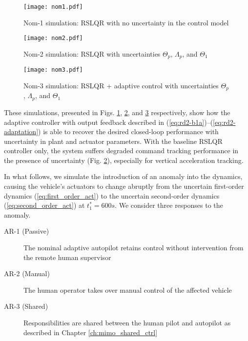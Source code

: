 \begin{figure}[htbp]
	\centering
	\texttt{[image: nom1.pdf]}
	\caption{Nom-1 simulation: RSLQR with no uncertainty in the control model}
	\label{fig:nom1}
\end{figure}

\begin{figure}[htbp]
	\centering
	\texttt{[image: nom2.pdf]}
	\caption{Nom-2 simulation: RSLQR with uncertainties $\Theta_p$, $\Lambda_p$, and $\Theta_1$}
	\label{fig:nom2}
\end{figure}

\begin{figure}[htbp]
	\centering
	\texttt{[image: nom3.pdf]}
	\caption{Nom-3 simulation: RSLQR + adaptive control with uncertainties $\Theta_p$, $\Lambda_p$, and $\Theta_1$}
	\label{fig:nom3}
\end{figure}

These simulations, presented in Figs. \ref{fig:nom1}, \ref{fig:nom2}, and \ref{fig:nom3} respectively, show how the adaptive controller with output feedback described in (\ref{eq:rd2-b1a})--(\ref{eq:rd2-adaptation}) is able to recover the desired closed-loop performance with uncertainty in plant and actuator parameters. With the baseline RSLQR controller only, the system suffers degraded command tracking performance in the presence of uncertainty (Fig. \ref{fig:nom2}), especially for vertical acceleration tracking.

In what follows, we simulate the introduction of an anomaly into the dynamics, causing the vehicle's actuators to change abruptly from the uncertain first-order dynamics (\ref{eq:first_order_act}) to the uncertain second-order dynamics (\ref{eq:second_order_act}) at $t_1^* = 600s$. We consider three responses to the anomaly.
\begin{description}
	\item[AR-1 (Passive)] The nominal adaptive autopilot retains control without intervention from the remote human supervisor
	\item[AR-2 (Manual)] The human operator takes over manual control of the affected vehicle
	\item[AR-3 (Shared)] Responsibilities are shared between the human pilot and autopilot as described in Chapter \ref{ch:mimo_shared_ctrl}
\end{description}

